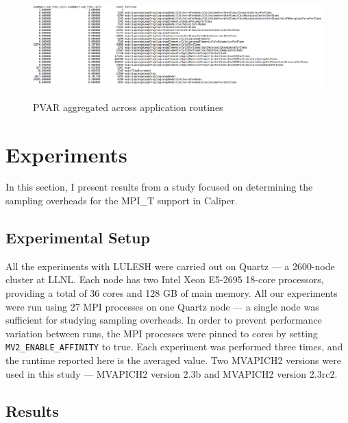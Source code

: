 \begin{center}
	\begin{figure}[bp!]
         \centering
  \captionsetup{justification=centering}
		\includegraphics[scale=0.8, width=\columnwidth, height=4cm]{figures/CALIPER_app_counter_PVAR}
		\caption{PVAR aggregated across application routines}
		\label{fig:cali-app-counter}
	\end{figure}
\end{center}

\section{Experiments}
In this section, I present results from a study focused on determining the sampling overheads for the MPI\_T support in Caliper.
\subsection{Experimental Setup}
All the experiments with LULESH were carried out on Quartz --- a 2600-node cluster at LLNL. Each node has two Intel Xeon E5-2695 18-core processors, providing a total of 36 cores and 128 GB of main memory. All our experiments were run using 27 MPI processes on one Quartz node --- a single node was sufficient for studying sampling overheads. In order to prevent performance variation between runs, the MPI processes were pinned to cores by setting \verb+MV2_ENABLE_AFFINITY+ to true. Each experiment was performed three times, and the runtime reported here is the averaged value. Two MVAPICH2 versions were used in this study --- MVAPICH2 version 2.3b and MVAPICH2 version 2.3rc2. 
\subsection{Results}
